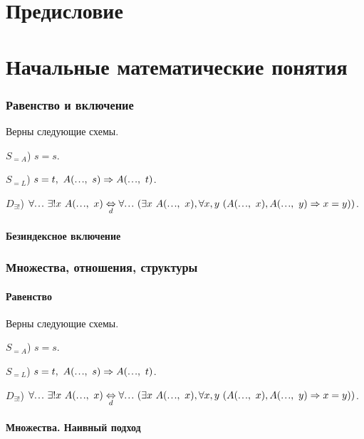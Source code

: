 \documentclass[a4paper]{article}
\newcommand\mydots{\hbox to 1em{.\hss.\hss.}}
\newcommand{\Def}[0]{\underset{d}{\Leftrightarrow}}
\begin{document}
\tableofcontents

\clearpage

\part{Предисловие}

\clearpage

\part{Начальные математические понятия}

\section{Равенство и включение}

Верны следующие схемы.

$S_{=A}$) $s = s$.

$S_{=L}$) $s = t,~ A(\mydots,~ s) \Rightarrow A(\mydots,~ t)$.

$D_{\exists!}$) $\forall \mydots ~\exists! x~ A(\mydots,~ x) \Def \forall \mydots~ (\exists x~ A(\mydots,~ x), \forall x, y~ (A(\mydots,~ x), A(\mydots,~ y) \Rightarrow x = y))$.

\subsection{Безиндексное включение}

\section{Множества, отношения, структуры}

\subsection{Равенство}

Верны следующие схемы.

$S_{=A}$) $s = s$.

$S_{=L}$) $s = t,~ A(\mydots,~ s) \Rightarrow A(\mydots,~ t)$.

$D_{\exists!}$) $\forall \mydots ~\exists! x~ A(\mydots,~ x) \Def \forall \mydots~ (\exists x~ A(\mydots,~ x), \forall x, y~ (A(\mydots,~ x), A(\mydots,~ y) \Rightarrow x = y))$.

\subsection{Множества. Наивный подход}
\end{document}
